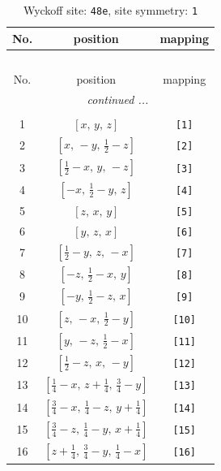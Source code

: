\documentclass[fleqn,8pt]{jsarticle}
\begin{document}
\begin{longtable}{ccc}
\caption{Wyckoff site: {\tt 48e}, site symmetry: {\tt 1}}
 \\
 \hline \hline
No. & position & mapping \\ \hline \endfirsthead

\multicolumn{2}{l}{\tablename\ \thetable{}} \\
 \hline \hline
No. & position & mapping \\ \hline \endhead

 \hline \hline
\multicolumn{2}{r}{\footnotesize\it continued ...} \\ \endfoot

 \hline \hline
\multicolumn{2}{r}{} \\ \endlastfoot

1 & $\left[ x,\, y,\, z \right]$ & {\tt [1]} \\ \hline
2 & $\left[ x,\, - y,\, \frac{1}{2} - z \right]$ & {\tt [2]} \\ \hline
3 & $\left[ \frac{1}{2} - x,\, y,\, - z \right]$ & {\tt [3]} \\ \hline
4 & $\left[ - x,\, \frac{1}{2} - y,\, z \right]$ & {\tt [4]} \\ \hline
5 & $\left[ z,\, x,\, y \right]$ & {\tt [5]} \\ \hline
6 & $\left[ y,\, z,\, x \right]$ & {\tt [6]} \\ \hline
7 & $\left[ \frac{1}{2} - y,\, z,\, - x \right]$ & {\tt [7]} \\ \hline
8 & $\left[ - z,\, \frac{1}{2} - x,\, y \right]$ & {\tt [8]} \\ \hline
9 & $\left[ - y,\, \frac{1}{2} - z,\, x \right]$ & {\tt [9]} \\ \hline
10 & $\left[ z,\, - x,\, \frac{1}{2} - y \right]$ & {\tt [10]} \\ \hline
11 & $\left[ y,\, - z,\, \frac{1}{2} - x \right]$ & {\tt [11]} \\ \hline
12 & $\left[ \frac{1}{2} - z,\, x,\, - y \right]$ & {\tt [12]} \\ \hline
13 & $\left[ \frac{1}{4} - x,\, z + \frac{1}{4},\, \frac{3}{4} - y \right]$ & {\tt [13]} \\ \hline
14 & $\left[ \frac{3}{4} - x,\, \frac{1}{4} - z,\, y + \frac{1}{4} \right]$ & {\tt [14]} \\ \hline
15 & $\left[ \frac{3}{4} - z,\, \frac{1}{4} - y,\, x + \frac{1}{4} \right]$ & {\tt [15]} \\ \hline
16 & $\left[ z + \frac{1}{4},\, \frac{3}{4} - y,\, \frac{1}{4} - x \right]$ & {\tt [16]} \\ \hline

\end{longtable}
\end{document}
